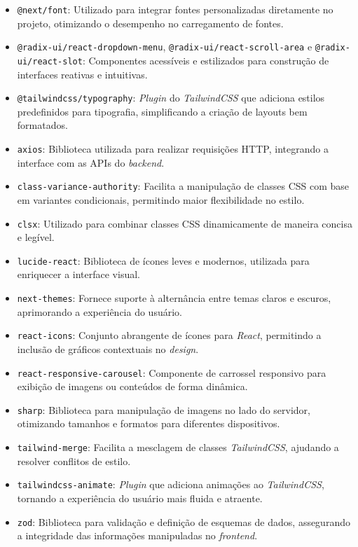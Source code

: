 \begin{itemize} 
  \item \texttt{@next/font}: Utilizado para integrar fontes personalizadas diretamente no projeto, otimizando o desempenho no carregamento de fontes. 
  \item \texttt{@radix-ui/react-dropdown-menu}, \texttt{@radix-ui/react-scroll-area} e \texttt{@radix-ui/react-slot}: Componentes acessíveis e estilizados para construção de interfaces reativas e intuitivas.
  \item \texttt{@tailwindcss/typography}: \textit{Plugin} do \textit{TailwindCSS} que adiciona estilos predefinidos para tipografia, simplificando a criação de layouts bem formatados. 
  \item \texttt{axios}: Biblioteca utilizada para realizar requisições HTTP, integrando a interface com as APIs do \textit{backend}. 
  \item \texttt{class-variance-authority}: Facilita a manipulação de classes CSS com base em variantes condicionais, permitindo maior flexibilidade no estilo. 
  \item \texttt{clsx}: Utilizado para combinar classes CSS dinamicamente de maneira concisa e legível. 
  \item \texttt{lucide-react}: Biblioteca de ícones leves e modernos, utilizada para enriquecer a interface visual. 
  \item \texttt{next-themes}: Fornece suporte à alternância entre temas claros e escuros, aprimorando a experiência do usuário. 
  \item \texttt{react-icons}: Conjunto abrangente de ícones para \textit{React}, permitindo a inclusão de gráficos contextuais no \textit{design}. 
  \item \texttt{react-responsive-carousel}: Componente de carrossel responsivo para exibição de imagens ou conteúdos de forma dinâmica. 
  \item \texttt{sharp}: Biblioteca para manipulação de imagens no lado do servidor, otimizando tamanhos e formatos para diferentes dispositivos. 
  \item \texttt{tailwind-merge}: Facilita a mesclagem de classes \textit{TailwindCSS}, ajudando a resolver conflitos de estilo. 
  \item \texttt{tailwindcss-animate}: \textit{Plugin} que adiciona animações ao \textit{TailwindCSS}, tornando a experiência do usuário mais fluida e atraente. 
  \item \texttt{zod}: Biblioteca para validação e definição de esquemas de dados, assegurando a integridade das informações manipuladas no \textit{frontend}. \end{itemize}

